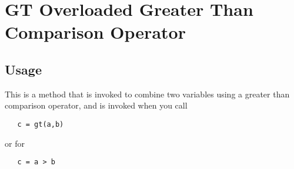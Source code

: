\section{GT Overloaded Greater Than Comparison Operator}

\subsection{Usage}

This is a method that is invoked to combine two variables using a
greater than comparison operator, and is invoked when you call
\begin{verbatim}
   c = gt(a,b)
\end{verbatim}
or for 
\begin{verbatim}
   c = a > b
\end{verbatim}
